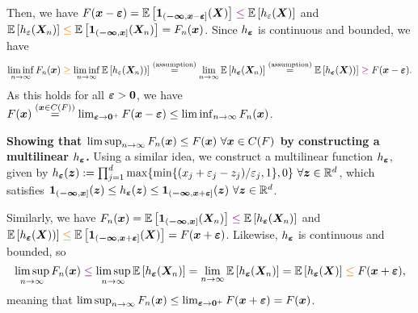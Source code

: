 \begin{enumerate}
\begin{pf}
Then, we have
\(F(\vect{x}-\vect{\varepsilon})
=\expv{\indic_{(\vect{-\infty},\vect{x}-\vect{\varepsilon}]}(\vect{X})}
\vc{\le}\expv{h_{\varepsilon}(\vect{X})}\) and
\(\expv{h_{\varepsilon}(\vect{X}_n)}
\orc{\le}\expv{\indic_{(\vect{-\infty},\vect{x}]}(\vect{X}_n)}
=F_n(\vect{x})\). Since \(h_{\bm{\varepsilon}}\) is continuous and bounded,
we have 
\[
\liminf_{n\to \infty}F_n(\vect{x})\orc{\ge}
\liminf_{n\to \infty}\expv{h_{\varepsilon}(\vect{X}_n))}
\overset{\text{(assumption)}}{=}\lim_{n\to\infty}\expv{h_{\vect{\varepsilon}}(\vect{X}_n)}
\overset{\text{(assumption)}}{=}
\expv{h_{\vect{\varepsilon}}(\vect{X}))}
\vc{\ge}
F(\vect{x}-\vect{\varepsilon}).
\]
As this holds for all \(\bm{\varepsilon}>\bm{0}\), we have
\(F(\bm{x})\overset{(\bm{x}\in
C(F))}{=}\lim_{\bm{\varepsilon}\to\bm{0}^{+}}F(\bm{x}-\bm{\varepsilon})\le
\liminf_{n\to \infty}F_n(\bm{x})\).

\textbf{Showing that \(\limsup_{n\to\infty}F_n(\bm{x})\le F(\bm{x})~\forall
\bm{x}\in C(F)\) by constructing a multilinear \(h_{\bm{\varepsilon}}\).}
Using a similar idea, we construct a multilinear function
\(h_{\bm{\varepsilon}}\), given by
\(h_{\bm{\varepsilon}}(\bm{z}):=\prod_{j=1}^{d}\max\{\min\{(x_j+\varepsilon_j-z_j)/\varepsilon_j,1\},0\}~\forall
\bm{z}\in\mathbb{R}^d\), which satisfies
\(\mathbf{1}_{(\bm{-\infty},\bm{x}]}(\bm{z})\le
h_{\bm{\varepsilon}}(\bm{z})\le
\mathbf{1}_{(\bm{-\infty},\bm{x}+\bm{\varepsilon}]}(\bm{z})~\forall
\bm{z}\in\mathbb{R}^d\). 

Similarly, we have \(F_n(\vect{x})
=\expv{\indic_{(\vect{-\infty},\vect{x}]}(\vect{X}_n)}
\vc{\le}\expv{h_{\vect{\varepsilon}}(\vect{X}_n)}\) and
\(\expv{h_{\vect{\varepsilon}}(\vect{X}))}
\orc{\le}\expv{\indic_{(\vect{-\infty},\vect{x}+\vect{\varepsilon}]}(\vect{X})}
=F(\vect{x}+\vect{\varepsilon})\). Likewise, \(h_{\bm{\varepsilon}}\) is
continuous and bounded, so
\[
\limsup_{n\to \infty}F_n(\vect{x})\vc{\le}
\limsup_{n\to \infty}\expv{h_{\vect{\varepsilon}}(\vect{X}_n)}
=\lim_{n\to\infty}\expv{h_{\vect{\varepsilon}}(\vect{X}_n)}
=\expv{h_{\vect{\varepsilon}}(\vect{X})}\orc{\le}F(\vect{x}+\vect{\varepsilon}),
\]
meaning that \(\limsup_{n\to \infty}F_n(\bm{x})
\le\lim_{\bm{\varepsilon}\to\bm{0}^{+}}F(\bm{x}+\bm{\varepsilon})
=F(\bm{x})\).


\end{pf}
\end{enumerate}
